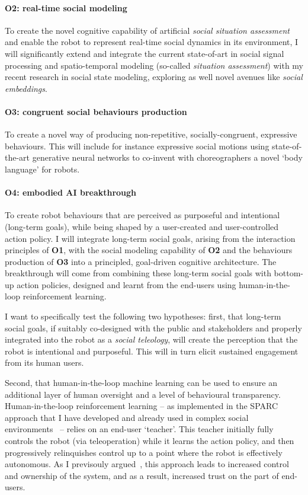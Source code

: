 \paragraph{\bf O2: real-time social modeling} To create the novel cognitive
capability of artificial \emph{social situation assessment} and enable the
robot to represent real-time social dynamics in its environment, I will
significantly extend and integrate the current state-of-art in social signal
processing and spatio-temporal modeling (so-called \emph{situation assessment})
with my recent research in social state modeling, exploring as well novel
avenues like \emph{social embeddings}.

\paragraph{\bf O3: congruent social behaviours production} 
To create a novel way of producing non-repetitive, socially-congruent,
expressive behaviours. This will include for instance expressive social motions using
state-of-the-art generative neural networks to co-invent with choreographers
a novel `body language' for robots.

\paragraph{\bf O4: embodied AI breakthrough} To create robot behaviours that are
perceived as purposeful and intentional (long-term goals), while being shaped by
a user-created and user-controlled action policy. I will integrate long-term
social goals, arising from the interaction principles of \textbf{O1}, with the
social modeling capability of \textbf{O2} and the behaviours production of
\textbf{O3} into a principled, goal-driven cognitive architecture. The
breakthrough will come from combining these long-term social goals with
bottom-up action policies, designed and learnt from the end-users using
human-in-the-loop reinforcement learning.

I want to specifically test the following two hypotheses: first, that long-term
social goals, if suitably co-designed with the public and stakeholders and
properly integrated into the robot as a \emph{social teleology}, will create the
perception that the robot is intentional and purposeful. This will in turn
elicit sustained engagement from its human users.

Second, that human-in-the-loop machine learning can
be used to ensure an additional layer of human oversight and a level of
behavioural transparency.  Human-in-the-loop reinforcement learning -- as
implemented in the SPARC approach that I have developed and already used in
complex social
environments~\parencite{senft2017supervised,senft2019teaching,winkle2020insitu}
-- relies on an end-user `teacher'. This teacher initially fully controls the
robot (via teleoperation) while it learns the action policy, and then
progressively relinquishes control up to a point where the robot is effectively
autonomous. As I previsouly argued~\parencite{senft2019teaching}, this approach
leads to increased control and ownership of the system, and as a result,
increased trust on the part of end-users.

